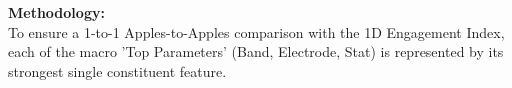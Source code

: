 \textbf{Methodology:}\\
To ensure a 1-to-1 Apples-to-Apples comparison with the 1D Engagement Index, each of the macro 'Top Parameters' (Band, Electrode, Stat) is represented by its strongest single constituent feature.